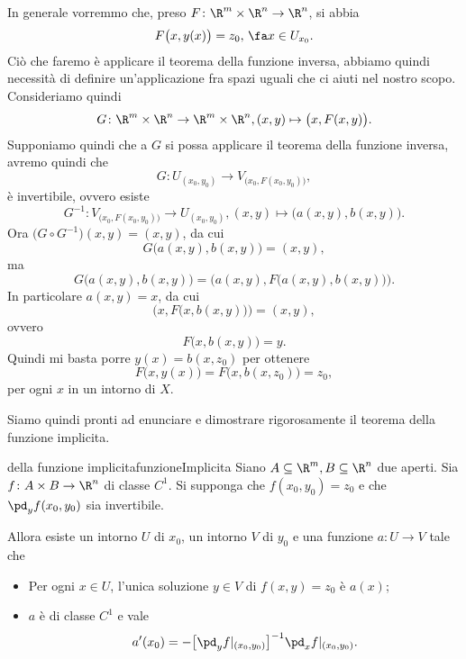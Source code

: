 \begin{oss}
	In generale vorremmo che, preso \(F\colon \R^m\times\R^n\to\R^n\), si abbia
	\[
		F\big(x,y(x)\big)=z_0,\,\fa x\in U_{x_0}.
	\]
	Ciò che faremo è applicare il teorema della funzione inversa, abbiamo quindi necessità di definire un'applicazione fra spazi uguali che ci aiuti nel nostro scopo.
	Consideriamo quindi
	\[
		G\colon\R^m\times\R^n\to\R^m\times\R^n,(x,y)\mapsto \big(x,F(x,y)\big).
	\]
	Supponiamo quindi che a \(G\) si possa applicare il teorema della funzione inversa, avremo quindi che
	\[
		G\colon U_{(x_0,y_0)}\to V_{\big(x_0,F(x_0,y_0)\big)},
	\]
	è invertibile, ovvero esiste
	\[
		G^{-1}\colon V_{\big(x_0,F(x_0,y_0)\big)}\to U_{(x_0,y_0)},(x,y)\mapsto\big(a(x,y),b(x,y)\big).
	\]
	Ora \(\big(G\circ G^{-1}\big)(x,y)=(x,y)\), da cui
	\[
		G\big(a(x,y),b(x,y)\big)=(x,y),
	\]
	ma
	\[
		G\big(a(x,y),b(x,y)\big)=\Big(a(x,y),F\big(a(x,y),b(x,y)\big)\Big).
	\]
	In particolare \(a(x,y)=x\), da cui
	\[
		\Big(x,F\big(x,b(x,y)\big)\Big)=(x,y),
	\]
	ovvero
	\[
		F\big(x,b(x,y)\big)=y.
	\]
	Quindi mi basta porre \(y(x)=b(x,z_0)\) per ottenere
	\[
		F\big(x,y(x)\big)=F\big(x,b(x,z_0)\big)=z_0,
	\]
	per ogni \(x\) in un intorno di \(X\).
\end{oss}

Siamo quindi pronti ad enunciare e dimostrare rigorosamente il teorema della funzione implicita.

\begin{teor}{della funzione implicita}{funzioneImplicita}
	Siano \(A\subseteq\R^m, B\subseteq \R^n\) due aperti.
	Sia \(f\colon A \times B \to \R^n\) di classe \(C^1\).
	Si supponga che \(f(x_0,y_0)=z_0\) e che \(\pd_y f(x_0,y_0)\) sia invertibile.

	Allora esiste un intorno \(U\) di \(x_0\), un intorno \(V\) di \(y_0\) e una funzione \(a\colon U \to V\) tale che
	\begin{itemize}
		\item Per ogni \(x\in U\), l'unica soluzione \(y\in V\) di \(f(x,y)=z_0\) è \(a(x)\);
		\item \(a\) è di classe \(C^1\) e vale
		      \[
			      a'(x_0) = -\big[\pd_y f|_{(x_0,y_0)}\big]^{-1} \pd_x f|_{(x_0,y_0)}.
		      \]
	\end{itemize}
\end{teor}

